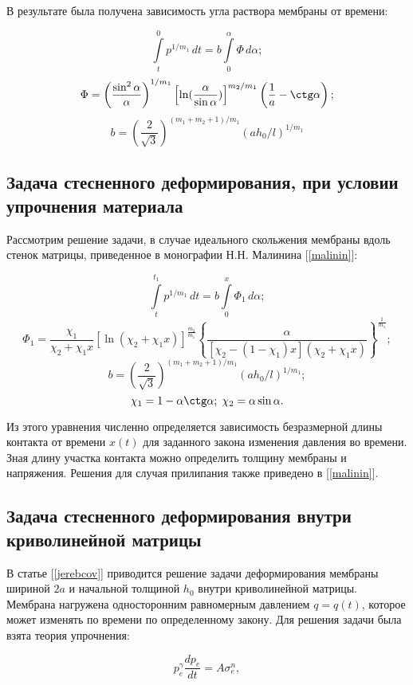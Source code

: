 В результате была получена зависимость угла раствора мембраны от времени:

	$$\int\limits^0_tp^{1/m_1}\,dt = b\int\limits_0^{\alpha}\Phi\,d\alpha;$$
	$$\Phi  = \left(\dfrac{\sin^2\alpha}{\alpha}\right)^{1/m_1}\left[\ln(\dfrac{\alpha}{\sin\alpha})\right]^{m_2/m_1}
	\left(\dfrac{1}{a} - \ctg \alpha \right);$$
	$$b = \left(\dfrac{2}{\sqrt 3}\right)^{(m_1+m_2+1)/m_1}(ah_0/l)^{1/m_1}$$

\subsection{Задача стесненного деформирования, при условии упрочнения материала}
Рассмотрим решение задачи, в случае идеального скольжения мембраны вдоль стенок матрицы, приведенное в 
монографии Н.Н. Малинина [\ref{malinin}]:


	$$\int\limits^{t_1}_tp^{1/m_1}\,dt = b\int\limits_0^x\Phi_1\,d\alpha;$$
	$$\Phi_1  = \dfrac{\chi_1}{\chi_2+\chi_1x}[\ln(\chi_2+\chi_1x)]^{\frac{m_2}{m_1}}
	\left\lbrace\dfrac{\alpha}{[\chi_2-(1-\chi_1)x](\chi_2+\chi_1x)}\right\rbrace^\frac{1}{m_1};$$
	$$b = \left(\dfrac{2}{\sqrt 3}\right)^{(m_1+m_2+1)/m_1}(ah_0/l)^{1/m_1};$$
	$$\chi_1=1-\alpha\ctg\alpha;\;\chi_2=\alpha\sin\alpha.$$

Из этого уравнения численно определяется зависимость безразмерной длины контакта от времени $x(t)$ для 
заданного закона изменения давления во времени. Зная длину участка контакта можно определить толщину 
мембраны и напряжения. Решения для случая прилипания также приведено в [\ref{malinin}].

\subsection{Задача стесненного деформирования внутри криволинейной матрицы}
В статье [\ref{jerebcov}] приводится решение задачи деформирования мембраны шириной $2a$ и начальной толщиной $h_0$ внутри криволинейной матрицы.
Мембрана нагружена односторонним равномерным давлением $q = q(t)$, которое может изменять по времени по определенному закону.
Для решения задачи была взята теория упрочнения:

\begin{equation}
p^{\gamma}_e\dfrac{dp_e}{dt} = A\sigma_e^n,
\end{equation} 


